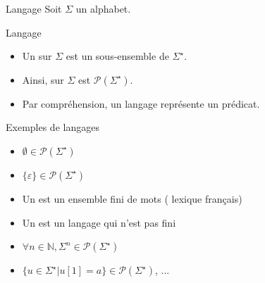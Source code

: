
\begingroup
\begin{frame}{Langage}
  Soit $\Sigma$ un alphabet.

  \begin{block}{Langage}
    \begin{itemize}
    \item Un  sur $\Sigma$ est un sous-ensemble de $\Sigma^\star$.
    \item Ainsi,  sur $\Sigma$ est \alert{$\mathscr{P}(\Sigma^\star)$}.
    \item Par compréhension, un langage représente un prédicat.
    \end{itemize}
  \end{block}

  \begin{exampleblock}{Exemples de langages}
    \begin{itemize}
    \item {} $\emptyset \in \mathscr{P}(\Sigma^\star)$
    \item {} $\{\varepsilon\} \in \mathscr{P}(\Sigma^\star)$
    \item Un  est un ensemble fini de mots ( lexique français)
    \item Un  est un langage qui n'est pas fini
\item $\forall n\in \mathbb{N}, \Sigma^n \in \mathscr{P}(\Sigma^\star)$
    \item $\{ u \in \Sigma^\star | u[1] = a\} \in \mathscr{P}(\Sigma^\star)$, ...
    \end{itemize}

  \end{exampleblock}
\end{frame}

\endgroup
